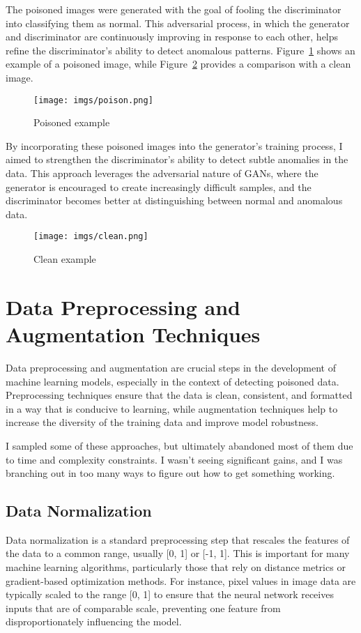 \documentclass[14]{article}
\begin{document}
The poisoned images were generated with the goal of fooling the discriminator into classifying them as normal. This adversarial process, in which the generator and discriminator are continuously improving in response to each other, helps refine the discriminator’s ability to detect anomalous patterns. Figure~\ref{fig:poison} shows an example of a poisoned image, while Figure~\ref{fig:clean} provides a comparison with a clean image.

\begin{figure}[h]
    \centering
    \texttt{[image: imgs/poison.png]}
    \caption{Poisoned example}
    \label{fig:poison}
\end{figure}

By incorporating these poisoned images into the generator’s training process, I aimed to strengthen the discriminator’s ability to detect subtle anomalies in the data. This approach leverages the adversarial nature of GANs, where the generator is encouraged to create increasingly difficult samples, and the discriminator becomes better at distinguishing between normal and anomalous data.

\begin{figure}[h]
    \centering
    \texttt{[image: imgs/clean.png]}
    \caption{Clean example}
    \label{fig:clean}
\end{figure}

\section{Data Preprocessing and Augmentation Techniques}
Data preprocessing and augmentation are crucial steps in the development of machine learning models, especially in the context of detecting poisoned data. Preprocessing techniques ensure that the data is clean, consistent, and formatted in a way that is conducive to learning, while augmentation techniques help to increase the diversity of the training data and improve model robustness.

I sampled some of these approaches, but ultimately abandoned most of them due to time and complexity constraints. I wasn't seeing significant gains, and I was branching out in too many ways to figure out how to get something working.

\subsection{Data Normalization}
Data normalization is a standard preprocessing step that rescales the features of the data to a common range, usually [0, 1] or [-1, 1]. This is important for many machine learning algorithms, particularly those that rely on distance metrics or gradient-based optimization methods. For instance, pixel values in image data are typically scaled to the range [0, 1] to ensure that the neural network receives inputs that are of comparable scale, preventing one feature from disproportionately influencing the model.
\end{document}
